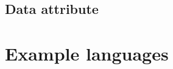 		\subsection{Data attribute} \label{s:information-viewpoint-template:data-attribute}
			\begin{comment}
				A description of data elements internal to the entity. The data attribute describes the method of
				representation, initial values, use, semantics, format, and acceptable values of internal data. The description
				of data may be in the form of a data dictionary that describes the content, structure, and use of all data
				elements. Data information should describe everything pertaining to the use of data or internal data
				structures by this entity. It should include data specifications such as formats, number of elements, and
				initial values. It should also include the structures to be used for representing data such as file structures,
				arrays, stacks, queues, and memory partitions.
				
				The meaning and use of data elements should be specified. This description includes such things as static
				versus dynamic, whether it is to be shared by transactions, used as a control parameter, or used as a value,
				loop iteration count, pointer, or link field. In addition, data information should include a description of data
				validation needed for the process.
				
				NOTE—This design attribute is retained for compatibility with IEEE Std 1016-1998.
			\end{comment}
			
	\section{Example languages} \label{s:information-viewpoint-template:example-languages}
		\begin{comment}
			IDEF1X (IEEE Std 1320.2™-1998 [B19]), UML class diagrams (OMG [B28]).
		\end{comment}